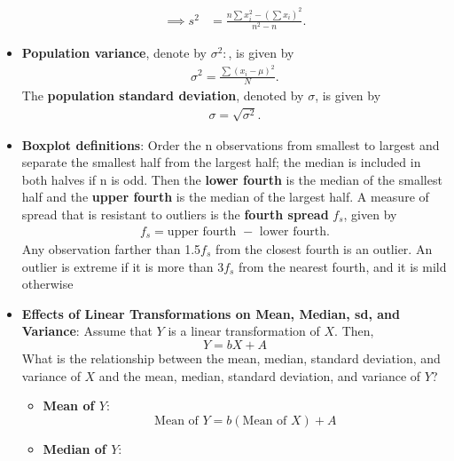 \documentclass{report}
\begin{document}
\begin{itemize}
\begin{align*}
                \implies s^{2} &= \frac{n\sum x_{i}^{2} - \left(\sum x_{i}\right)^{2}}{n^{2}-n}
            .\end{align*}
        \item \textbf{Population variance}, denote by $\sigma^{2}:$, is given by
            \begin{align*}
                \sigma^{2} = \frac{\sum (x_{i} - \mu)^{2}}{N}
            .\end{align*}
            The \textbf{population standard deviation}, denoted by $\sigma$, is given by
            \begin{align*}
                \sigma = \sqrt{\sigma^{2}}
            .\end{align*}

        \item \textbf{Boxplot definitions}:
            \bigbreak \noindent 
            Order the n observations from smallest to largest and separate the smallest half
            from the largest half; the median is included in both halves if n is odd. Then
            the \textbf{lower fourth} is the median of the smallest half and the \textbf{upper fourth} is
            the median of the largest half. A measure of spread that is resistant to outliers
            is the \textbf{fourth spread} $f_{s}$, given by
            \begin{align*}
                f_{s} = \text{upper fourth } - \text{ lower fourth}
            .\end{align*}
            \bigbreak \noindent 
            Any observation farther than 1.5$f_{s}$ from the closest fourth is an outlier. An outlier
            is extreme if it is more than $3f_{s}$ from the nearest fourth, and it is mild otherwise
        \item \textbf{Effects of Linear Transformations on Mean, Median, sd, and Variance}:
            Assume that \( Y \) is a linear transformation of \( X \). Then,
            \bigbreak \noindent
            \[
                Y = bX + A
            \]
            \bigbreak \noindent 
            What is the relationship between the mean, median, standard deviation, and variance of \( X \) and the mean, median, standard deviation, and variance of \( Y \)?
            \begin{itemize}
                \item \textbf{Mean of \( Y \)}: 
                    \[
                        \text{Mean of } Y = b (\text{Mean of } X) + A
                    \]
                \item \textbf{Median of \( Y \)}: 

\end{itemize}
\end{itemize}
\end{document}
